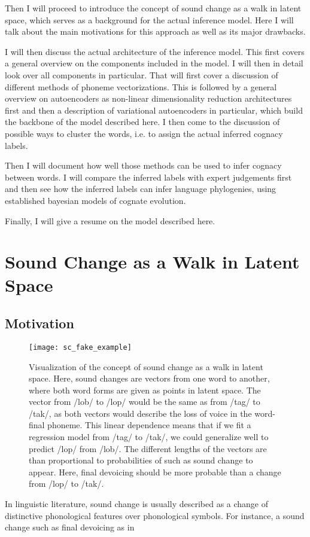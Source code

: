 \documentclass[8pt]{article}
\begin{document}
Then I will proceed to introduce the concept of sound change as a walk in latent space, which serves as a background for the actual inference model. Here I will talk about the main motivations for this approach as well as its major drawbacks. 


I will then discuss the actual architecture of the inference model. This first covers a general overview on the components included in the model. I will then in detail look over all components in particular. That will first cover a discussion of different methods of phoneme vectorizations. This is followed by a general overview on autoencoders as non-linear dimensionality reduction architectures first and then a description of variational autoencoders in particular, which build the backbone of the model described here. I then come to the discussion of possible ways to cluster the words, i.e. to assign the actual inferred cognacy labels.

Then I will document how well those methods can be used to infer cognacy between words. I will compare the inferred labels with expert judgements first and then see how the inferred labels can infer language phylogenies, using established bayesian models of cognate evolution.

Finally, I will give a resume on the model described here.


\section{Sound Change as a Walk in Latent Space}
\label{Sound Change as a Walk in Latent Space}
\subsection{Motivation}

\begin{figure}[h]
\begin{center}
\texttt{[image: sc\_fake\_example]} 
\caption{Visualization of the concept of sound change as a walk in latent space. Here, sound changes are vectors from one word to another, where both word forms are given as points in latent space. The vector from /lob/ to /lop/ would be the same as from /tag/ to /tak/, as both vectors would describe the loss of voice in the word-final phoneme. This linear dependence means that if we fit a regression model from /tag/ to /tak/, we could generalize well to predict /lop/ from /lob/. The different lengths of the vectors are than proportional to probabilities of such as sound change to appear. Here, final devoicing should be more probable than a change from /lop/ to /tak/. }
\label{default}
\end{center}
\end{figure}
In linguistic literature, sound change is usually described as a change of distinctive phonological features over phonological symbols. For instance, a sound change such as final devoicing as in 
\end{document}
